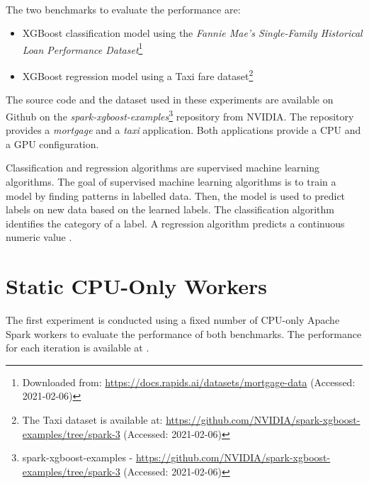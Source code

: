\paragraph{}
The two benchmarks to evaluate the performance are:
\begin{itemize}
\item XGBoost classification model using the \textit{Fannie Mae’s Single-Family Historical Loan Performance Dataset}\footnote{Downloaded from: \url{https://docs.rapids.ai/datasets/mortgage-data} (Accessed: 2021-02-06)}\cite{Fannie2021Mortgage}

\item XGBoost regression model using a Taxi fare dataset\footnote{The Taxi dataset is available at: \url{https://github.com/NVIDIA/spark-xgboost-examples/tree/spark-3} (Accessed: 2021-02-06)}
\end{itemize}
The source code and the dataset used in these experiments are available on Github on the \textit{spark-xgboost-examples}\footnote{spark-xgboost-examples - \url{https://github.com/NVIDIA/spark-xgboost-examples/tree/spark-3} (Accessed: 2021-02-06)} repository from NVIDIA.
The repository provides a \textit{mortgage} and a \textit{taxi} application. Both applications provide a CPU and a GPU configuration.

Classification and regression algorithms are supervised machine learning algorithms.
The goal of supervised machine learning algorithms is to train a model by finding patterns in labelled data. Then, the model is used to predict labels on new data based on the learned labels.
The classification algorithm identifies the category of a label.
A regression algorithm predicts a continuous numeric value \cite{Mcdonald2020SparkRapids}.


\section{Static CPU-Only Workers}
\label{sec:07_static}
The first experiment is conducted using a fixed number of CPU-only Apache Spark workers to evaluate the performance of both benchmarks.
The performance for each iteration is available at .


